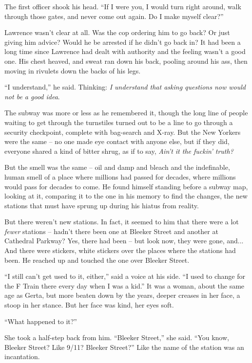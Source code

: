 The first officer shook his head. “If I were you, I would turn right 
around, walk through those gates, and never come out again. Do I make 
myself clear?”

Lawrence wasn't clear at all. Was the cop ordering him to go back? Or 
just giving him advice? Would he be arrested if he didn't go back in? 
It had been a long time since Lawrence had dealt with authority and the 
feeling wasn't a good one. His chest heaved, and sweat ran down his 
back, pooling around his ass, then moving in rivulets down the backs of 
his legs.

“I understand,” he said. Thinking: \emph{I understand that asking 
questions now would not be a good idea}.

\tb

The subway was more or less as he remembered it, though the long line 
of people waiting to get through the turnstiles turned out to be a line 
to go through a security checkpoint, complete with bag-search and 
X-ray. But the New Yorkers were the same -- no one made eye contact 
with anyone else, but if they did, everyone shared a kind of bitter 
shrug, as if to say, \emph{Ain't it the fuckin' truth?}

But the smell was the same -- oil and damp and bleach and the 
indefinable, human smell of a place where millions had passed for 
decades, where millions would pass for decades to come. He found 
himself standing before a subway map, looking at it, comparing it to 
the one in his memory to find the changes, the new stations that must 
have sprung up during his hiatus from reality.

But there weren't new stations. In fact, it seemed to him that there 
were a lot \emph{fewer} stations -- hadn't there been one at Bleeker 
Street and another at Cathedral Parkway? Yes, there had been -- but 
look now, they were gone, and... And there were stickers, white 
stickers over the places where the stations had been. He reached up and 
touched the one over Bleeker Street.

“I still can't get used to it, either,” said a voice at his side. 
“I used to change for the F Train there every day when I was a 
kid.” It was a woman, about the same age as Gerta, but more beaten 
down by the years, deeper creases in her face, a stoop in her stance. 
But her face was kind, her eyes soft.

“What happened to it?”

She took a half-step back from him. “Bleeker Street,” she said. 
“You know, Bleeker Street? Like 9/11? Bleeker Street?” Like the 
name of the station was an incantation.

